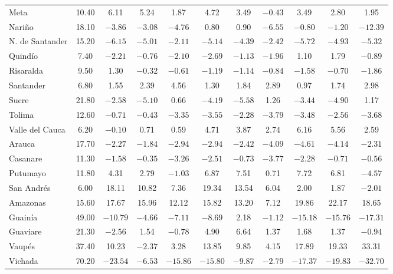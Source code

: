 \begin{longtable}{l c c c c c c c c c c}
Meta & 10.40 & 6.11 & 5.24 & 1.87 & 4.72 & 3.49 & $-0.43$ & 3.49 & 2.80 & 1.95 \\
Nariño & 18.10 & $-3.86$ & $-3.08$ & $-4.76$ & 0.80 & 0.90 & $-6.55$ & $-0.80$ & $-1.20$ & $-12.39$ \\
N. de Santander & 15.20 & $-6.15$ & $-5.01$ & $-2.11$ & $-5.14$ & $-4.39$ & $-2.42$ & $-5.72$ & $-4.93$ & $-5.32$ \\
Quindío & 7.40 & $-2.21$ & $-0.76$ & $-2.10$ & $-2.69$ & $-1.13$ & $-1.96$ & 1.10 & 1.79 & $-0.89$ \\
Risaralda & 9.50 & 1.30 & $-0.32$ & $-0.61$ & $-1.19$ & $-1.14$ & $-0.84$ & $-1.58$ & $-0.70$ & $-1.86$ \\
Santander & 6.80 & 1.55 & 2.39 & 4.56 & 1.30 & 1.84 & 2.89 & 0.97 & 1.74 & 2.98 \\
Sucre & 21.80 & $-2.58$ & $-5.10$ & 0.66 & $-4.19$ & $-5.58$ & 1.26 & $-3.44$ & $-4.90$ & 1.17 \\
Tolima & 12.60 & $-0.71$ & $-0.43$ & $-3.35$ & $-3.55$ & $-2.28$ & $-3.79$ & $-3.48$ & $-2.56$ & $-3.68$ \\
Valle del Cauca & 6.20 & $-0.10$ & 0.71 & 0.59 & 4.71 & 3.87 & 2.74 & 6.16 & 5.56 & 2.59 \\
Arauca & 17.70 & $-2.27$ & $-1.84$ & $-2.94$ & $-2.94$ & $-2.42$ & $-4.09$ & $-4.61$ & $-4.14$ & $-2.31$ \\
Casanare & 11.30 & $-1.58$ & $-0.35$ & $-3.26$ & $-2.51$ & $-0.73$ & $-3.77$ & $-2.28$ & $-0.71$ & $-0.56$ \\
Putumayo & 11.80 & 4.31 & 2.79 & $-1.03$ & 6.87 & 7.51 & 0.71 & 7.72 & 6.81 & $-4.57$ \\
San Andrés & 6.00 & 18.11 & 10.82 & 7.36 & 19.34 & 13.54 & 6.04 & 2.00 & 1.87 & $-2.01$ \\
Amazonas & 15.60 & 17.67 & 15.96 & 12.12 & 15.82 & 13.20 & 7.12 & 19.86 & 22.17 & 18.65 \\
Guainía & 49.00 & $-10.79$ & $-4.66$ & $-7.11$ & $-8.69$ & 2.18 & $-1.12$ & $-15.18$ & $-15.76$ & $-17.31$ \\
Guaviare & 21.30 & $-2.56$ & 1.54 & $-0.78$ & 4.90 & 6.64 & 1.37 & 1.68 & 1.37 & $-0.94$ \\
Vaupés & 37.40 & 10.23 & $-2.37$ & 3.28 & 13.85 & 9.85 & 4.15 & 17.89 & 19.33 & 33.31 \\
Vichada & 70.20 & $-23.54$ & $-6.53$ & $-15.86$ & $-15.80$ & $-9.87$ & $-2.79$ & $-17.37$ & $-19.83$ & $-32.70$ \\
\end{longtable}
\normalsize
\setlength{\tabcolsep}{6pt}


